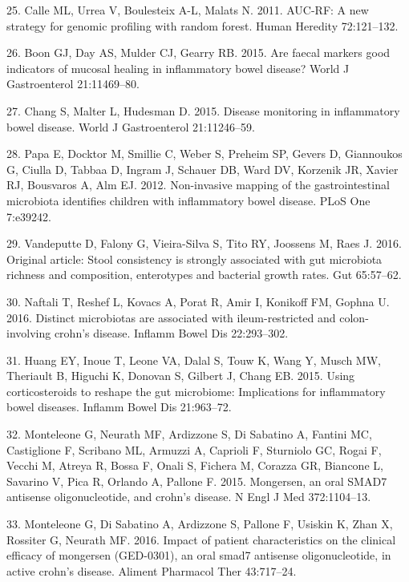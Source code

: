 \documentclass[11pt,]{article}
\begin{document}
\hypertarget{ref-calle_aucrf_2011}{}
25. Calle ML, Urrea V, Boulesteix A-L, Malats N. 2011. AUC-RF: A new
strategy for genomic profiling with random forest. Human Heredity
72:121--132.

\hypertarget{ref-boon_fmarkers_2015}{}
26. Boon GJ, Day AS, Mulder CJ, Gearry RB. 2015. Are faecal markers good
indicators of mucosal healing in inflammatory bowel disease? World J
Gastroenterol 21:11469--80.

\hypertarget{ref-chang_monitoring_2015}{}
27. Chang S, Malter L, Hudesman D. 2015. Disease monitoring in
inflammatory bowel disease. World J Gastroenterol 21:11246--59.

\hypertarget{ref-papa_pedsIBD_2012}{}
28. Papa E, Docktor M, Smillie C, Weber S, Preheim SP, Gevers D,
Giannoukos G, Ciulla D, Tabbaa D, Ingram J, Schauer DB, Ward DV,
Korzenik JR, Xavier RJ, Bousvaros A, Alm EJ. 2012. Non-invasive mapping
of the gastrointestinal microbiota identifies children with inflammatory
bowel disease. PLoS One 7:e39242.

\hypertarget{ref-vandeputte_stoolcon_2016}{}
29. Vandeputte D, Falony G, Vieira-Silva S, Tito RY, Joossens M, Raes J.
2016. Original article: Stool consistency is strongly associated with
gut microbiota richness and composition, enterotypes and bacterial
growth rates. Gut 65:57--62.

\hypertarget{ref-naftali_tissinvol_2016}{}
30. Naftali T, Reshef L, Kovacs A, Porat R, Amir I, Konikoff FM, Gophna
U. 2016. Distinct microbiotas are associated with ileum-restricted and
colon-involving crohn's disease. Inflamm Bowel Dis 22:293--302.

\hypertarget{ref-huang_cort_2015}{}
31. Huang EY, Inoue T, Leone VA, Dalal S, Touw K, Wang Y, Musch MW,
Theriault B, Higuchi K, Donovan S, Gilbert J, Chang EB. 2015. Using
corticosteroids to reshape the gut microbiome: Implications for
inflammatory bowel diseases. Inflamm Bowel Dis 21:963--72.

\hypertarget{ref-monteleone_mongersen_2015}{}
32. Monteleone G, Neurath MF, Ardizzone S, Di Sabatino A, Fantini MC,
Castiglione F, Scribano ML, Armuzzi A, Caprioli F, Sturniolo GC, Rogai
F, Vecchi M, Atreya R, Bossa F, Onali S, Fichera M, Corazza GR, Biancone
L, Savarino V, Pica R, Orlando A, Pallone F. 2015. Mongersen, an oral
SMAD7 antisense oligonucleotide, and crohn's disease. N Engl J Med
372:1104--13.

\hypertarget{ref-monteleone_mongersen_2016}{}
33. Monteleone G, Di Sabatino A, Ardizzone S, Pallone F, Usiskin K, Zhan
X, Rossiter G, Neurath MF. 2016. Impact of patient characteristics on
the clinical efficacy of mongersen (GED-0301), an oral smad7 antisense
oligonucleotide, in active crohn's disease. Aliment Pharmacol Ther
43:717--24.
\end{document}
